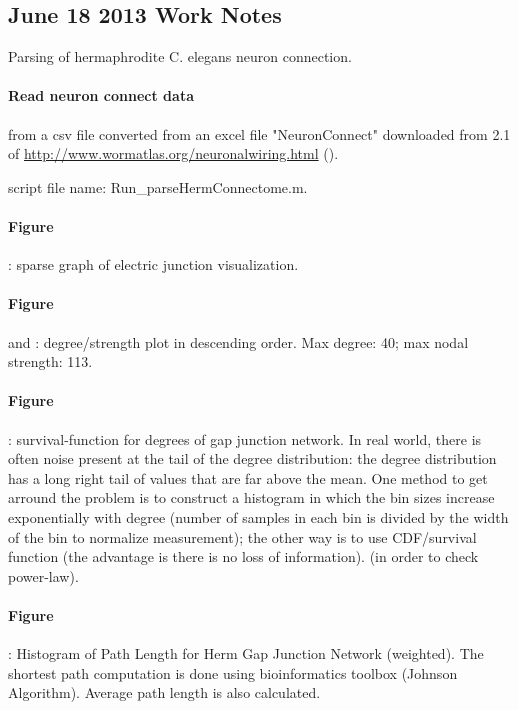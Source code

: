 \subsection{June 18 2013 Work Notes}
\label{06-18-2013}

\setcounter{FigureCounter}{1}

Parsing of hermaphrodite C. elegans neuron connection.

\paragraph{Read neuron connect data} from a csv file converted from an excel file "NeuronConnect" downloaded from 2.1 of \url{http://www.wormatlas.org/neuronalwiring.html} (\cite{varshney_structural_2011}). 

script file name: Run\_parseHermConnectome.m.

\paragraph{Figure} : sparse graph of electric junction visualization.

\paragraph{Figure}  and : degree/strength plot in descending order. Max degree: 40; max nodal strength: 113.

\paragraph{Figure} : \Gls{survival-function} for degrees of gap junction network. In real world, there is often noise present at the tail of the
degree distribution: the degree distribution has a long right tail of values that are far above the mean. One method to get arround the problem is to construct a
histogram in which the bin sizes increase exponentially with degree (number of samples in each bin is divided by the width of the bin to normalize measurement); the
other way is to use CDF/survival function (the advantage is there is no loss of information). (in order to check \gls{power-law}).

\paragraph{Figure} : Histogram of Path Length for Herm Gap Junction Network (weighted). The shortest path computation is done using bioinformatics toolbox
(Johnson Algorithm). Average path length is also calculated.

